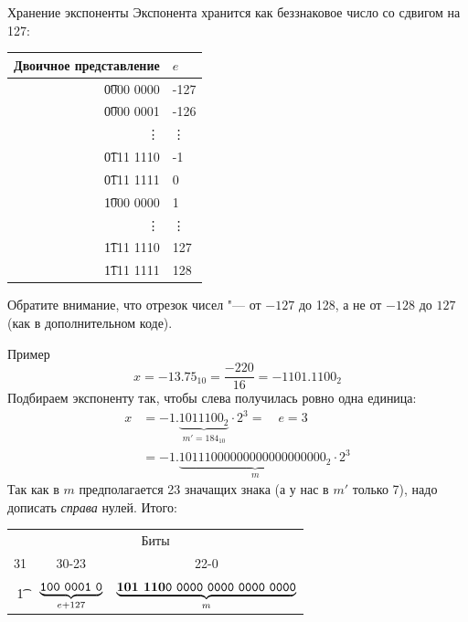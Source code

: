 \begin{frame}{Хранение экспоненты}
	Экспонента хранится как беззнаковое число со сдвигом на 127:
	\begin{center}
		\begin{tabular}{r|l}
			Двоичное представление & $e$ \\\hline
			\t{0000 0000} & -127 \\
			\t{0000 0001} & -126 \\
			\vdots & \vdots \\
			\t{0111 1110} & -1 \\
			\t{0111 1111} & 0 \\
			\t{1000 0000} & 1 \\
			\vdots & \vdots \\
			\t{1111 1110} & 127 \\
			\t{1111 1111} & 128 \\
		\end{tabular}
	\end{center}
	Обратите внимание, что отрезок чисел "--- от $-127$ до 128, а не от $-128$ до $127$ (как в дополнительном коде).
\end{frame}

\begin{frame}{Пример}
	\[
		x = -13.75_{10} = \frac{-220}{16} = -1101.1100_2
	\]
	Подбираем экспоненту так, чтобы слева получилась ровно одна единица:
	\begin{align*}
		x &= -1.\underbrace{1011100_2}_{m'=184_{10}} \cdot 2^3 = \quad e=3 \\
		  &= -1.\underbrace{10111000000000000000000_2}_{m} \cdot 2^3
	\end{align*}
	Так как в $m$ предполагается 23 значащих знака (а у нас в $m'$ только 7), надо дописать \textit{справа} нулей.
	Итого:
	\begin{center}
		\begin{tabular}{c|c|c}
			\multicolumn{3}{c}{Биты} \\
			31 & 30-23 & 22-0 \\\hline
			\t{1} & $\underbrace{\t{100~0001~0}}_{e+127}$ & $\underbrace{\t{\textbf{101~110}0~0000~0000~0000~0000}}_{m}$ \\
		\end{tabular}
	\end{center}	
\end{frame}

